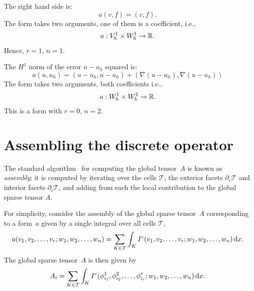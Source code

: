 \begin{example}
\label{example:rhs}
The right hand side is: 
\begin{equation}
a(v,f) = (v,f). 
\end{equation}
The form takes two arguments, one of them is a coefficient, i.e.,
\begin{equation}
a : V_h^1 \times  W_h^1 \rightarrow \mathbb{R}.
\end{equation}
Hence, $r=1$, $n=1$. 
\end{example}

\begin{example}
The $H^1$ norm of the error $u-u_h$ squared is: 
\begin{equation}
a(u,u_h) = (u-u_h, u-u_h) + (\nabla (u-u_h), \nabla(u-u_h))    
\end{equation}
The form takes two arguments, both coefficients i.e.,
\begin{equation}
a : W_h^1 \times  W_h^2 \rightarrow \mathbb{R}.
\end{equation}
This is a form with $r=0$, $n=2$. 
\end{example}



\section{Assembling the discrete operator}

The standard algorithm~\cite{ZieTay67,Hug87,Lan99} for computing
the global tensor~$A$ is known as \emph{assembly}; it is
computed by iterating over the cells $\mathcal{T}$, 
the exterior facets $\partial_e\mathcal{T}$ and
interior facets $\partial_i\mathcal{T}$, and adding from each
the local contribution to the global sparse tensor $A$.

For simplicity, consider the assembly of the global sparse tensor~$A$
corresponding to a form~$a$ given by a single integral
over all cells $\mathcal{T}$,
\begin{equation}
  a(v_1, v_2, \ldots, v_r; w_1, w_2, \ldots, w_n) =
  \sum_{K\in\mathcal{T}} \int_K
  I^c(v_1, v_2, \ldots, v_r; w_1, w_2, \ldots, w_n) \, \mathrm{d}x.
\end{equation}
The global sparse tensor~$A$ is then given by
\begin{equation}
  A_i = \sum_{K\in\mathcal{T}} \int_K
  I^c(\phi^1_{i_1}, \phi^2_{i_2}, \ldots, \phi^r_{i_r}; w_1, w_2, \ldots, w_n) \, \mathrm{d}x.
\end{equation}

